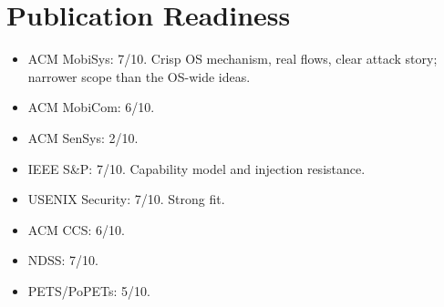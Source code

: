 \documentclass[11pt]{article}
\begin{document}
\section{Publication Readiness}
\begin{itemize}
  \item ACM MobiSys: 7/10. Crisp OS mechanism, real flows, clear attack story; narrower scope than the OS-wide ideas.
  \item ACM MobiCom: 6/10.
  \item ACM SenSys: 2/10.
  \item IEEE S\&P: 7/10. Capability model and injection resistance.
  \item USENIX Security: 7/10. Strong fit.
  \item ACM CCS: 6/10.
  \item NDSS: 7/10.
  \item PETS/PoPETs: 5/10.
\end{itemize}
\end{document}
